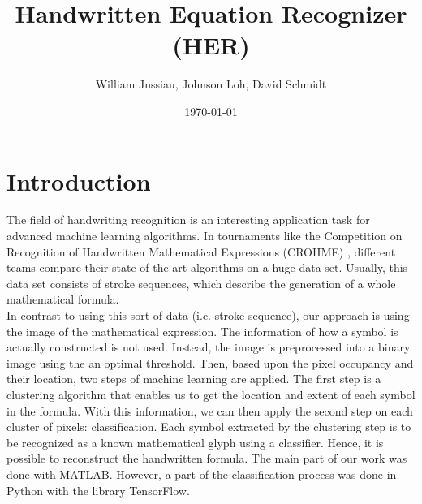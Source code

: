 \documentclass[twocolumn]{article}%
\title{Handwritten Equation Recognizer (HER)}
\author{William Jussiau, Johnson Loh, David Schmidt}
\date{\today}
\begin{document}


	\section{Introduction}
		The field of handwriting recognition is an interesting application task for advanced machine learning algorithms. In tournaments like the Competition on Recognition of Handwritten Mathematical Expressions (CROHME) \cite{crohme}, different teams compare their state of the art algorithms on a huge data set. Usually, this data set consists of stroke sequences, which describe the generation of a whole mathematical formula.\\
		In contrast to using this sort of data (i.e. stroke sequence), our approach is using the image of the mathematical expression. The information of how a symbol is actually constructed is not used. Instead, the image is preprocessed into a binary image using the an optimal threshold. Then, based upon the pixel occupancy and their location, two steps of machine learning are applied. The first step is a clustering algorithm that enables us to get the location and extent of each symbol in the formula. With this information, we can then apply the second step on each cluster of pixels: classification. Each symbol extracted by the clustering step is to be recognized as a known mathematical glyph using a classifier.  Hence, it is possible to reconstruct the handwritten formula.
		The main part of our work was done with MATLAB. However, a part of the classification process was done in Python with the library TensorFlow.
	    	    
\end{document}
